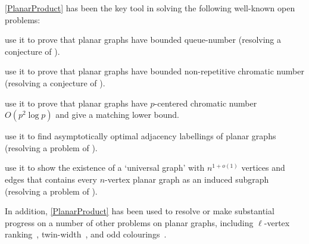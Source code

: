 \documentclass{patmorin}
\theoremstyle{plain}
\theoremstyle{definition}
\begin{document}
\noindent\cref{PlanarProduct} has been the key tool in solving the following well-known open problems:
\begin{compactitem}
\item \citet{DJMMUW20} use it to prove that planar graphs have bounded queue-number (resolving a conjecture of \citet{HLR92}).
\item  \citet{dujmovic.esperet.ea:planar} use it to prove that planar graphs have bounded non-repetitive chromatic number (resolving a conjecture of \citet{AGHR-RSA02}).
\item \citet{DFMS21} use it to prove that planar graphs have $p$-centered chromatic number $O(p^2\log p)$ and give a matching lower bound.
\item \citet{DEJGMM21} use it to find asymptotically optimal adjacency labellings of planar graphs (resolving a problem of \citet{kannan.naor.ea:implicit}).
\item \citet{EJM} use it to show the existence of a `universal graph' with $n^{1+o(1)}$ vertices and edges that contains every $n$-vertex planar graph as an induced subgraph (resolving a problem of \citet{babai.chung.ea:on}).
\end{compactitem}
In addition, \cref{PlanarProduct} has been used to resolve or make substantial progress on a number of other problems on planar graphs, including $\ell$-vertex ranking~\citep{BDJM}, twin-width~\citep{BKW}, and odd colourings~\citep{DMO}.

\end{document}

